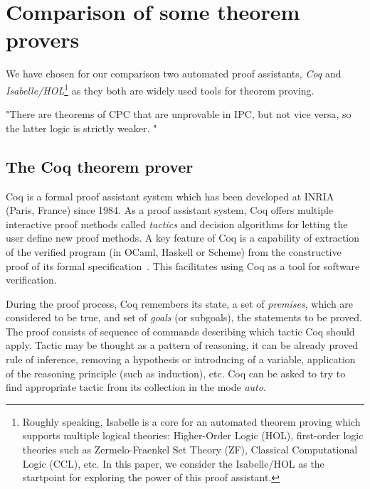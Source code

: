 \documentclass[article]{aaltoseries}
\begin{document}
\section{Comparison of some theorem provers}
\label{sec:comparison}

We have chosen for our comparison two automated proof assistants, \textit{Coq} and \textit{Isabelle/HOL}\footnote{Roughly speaking, Isabelle is a core for an automated theorem proving which supports multiple logical theories: Higher-Order Logic (HOL), first-order logic theories such as Zermelo-Fraenkel Set Theory (ZF), Classical Computational Logic (CCL), etc. In this paper, we consider the Isabelle/HOL as the startpoint for exploring the power of this proof assistant.} as they both are widely used tools for theorem proving.

"There are theorems of CPC that are unprovable in IPC, but not vice versa, so the latter logic is strictly weaker. "


\subsection{The Coq theorem prover}
\label{sec:prover_coq}

Coq is a formal proof assistant system which has been developed at INRIA (Paris, France) since 1984. As a proof assistant system, Coq offers multiple interactive proof methods called \textit{tactics} and decision algorithms for letting the user define new proof methods. A key feature of Coq is a capability of extraction of the verified program (in OCaml, Haskell or Scheme) from the constructive proof of its formal specification~\cite{tool_Coq}. This facilitates using Coq as a tool for software verification.

During the proof process, Coq remembers its state, a set of \textit{premises}, which are considered to be true, and set of \textit{goals} (or subgoals), the statements to be proved. The proof consists of sequence of commands describing which tactic Coq should apply. Tactic may be thought as a pattern of reasoning, it can be already proved rule of inference, removing a hypothesis or introducing of a variable, application of the reasoning principle (such as induction), etc. Coq can be asked to try to find appropriate tactic from its collection in the mode \textit{auto}.
\end{document}
